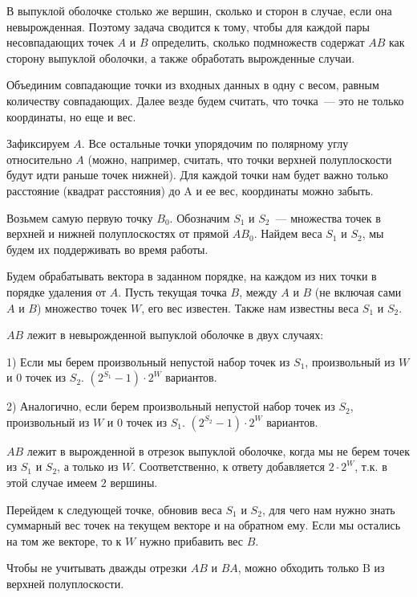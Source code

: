 \documentclass{article}
\begin{document}
В выпуклой оболочке столько же вершин, сколько и сторон в случае, если она невырожденная.
Поэтому задача сводится к тому, чтобы для каждой пары несовпадающих точек $A$ и $B$ определить, сколько подмножеств содержат $AB$ как сторону выпуклой оболочки, а также обработать вырожденные случаи.

Объединим совпадающие точки из входных данных в одну с весом, равным количеству совпадающих.
Далее везде будем считать, что точка~--- это не только координаты, но еще и вес.

Зафиксируем $A$. Все остальные точки упорядочим по полярному углу относительно $A$ (можно, например, считать, что точки верхней полуплоскости будут идти раньше точек нижней).
Для каждой точки нам будет важно только расстояние (квадрат расстояния) до A и ее вес, координаты можно забыть.

Возьмем самую первую точку $B_0$.
Обозначим $S_1$ и $S_2$~--- множества точек в верхней и нижней полуплоскостях от прямой $AB_0$.
Найдем веса $S_1$ и $S_2$, мы будем их поддерживать во время работы.

Будем обрабатывать вектора в заданном порядке, на каждом из них точки в порядке удаления от $A$.
Пусть текущая точка $B$, между $A$ и $B$ (не включая сами $A$ и $B$) множество точек $W$, его вес известен.
Также нам известны веса $S_1$ и $S_2$.

$AB$ лежит в невырожденной выпуклой оболочке в двух случаях:

1) Если мы берем произвольный непустой набор точек из $S_1$, произвольный из $W$ и $0$ точек из $S_2$.
$(2^{S_1} - 1) \cdot 2^W$ вариантов.

2) Аналогично, если берем произвольный непустой набор точек из $S_2$, произвольный из $W$ и $0$ точек из $S_1$.
$(2^{S_2} - 1) \cdot 2^W$ вариантов.

$AB$ лежит в вырожденной в отрезок выпуклой оболочке, когда мы не берем точек из $S_1$ и $S_2$, а только из $W$.
Соответственно, к ответу добавляется $2 \cdot 2^W$, т.к. в этой случае имеем $2$ вершины.

Перейдем к следующей точке, обновив веса $S_1$ и $S_2$, для чего нам нужно знать суммарный вес точек на текущем векторе и на обратном ему. Если мы остались на том же векторе, то к $W$ нужно прибавить вес $B$.

Чтобы не учитывать дважды отрезки $AB$ и $BA$, можно обходить только B из верхней полуплоскости.
\end{document}
